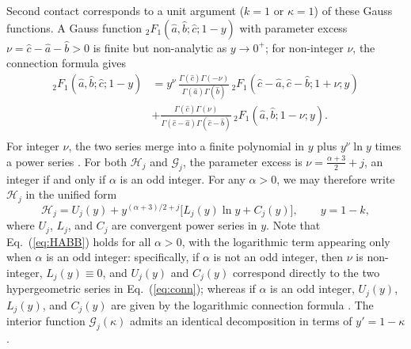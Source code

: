 \documentclass[11pt]{article}
\begin{document}
Second contact corresponds to a unit argument ($k=1$ or $\kappa=1$) of these Gauss functions. A Gauss function ${}_2F_1(\hat a,\hat b;\hat c;1-y)$ with parameter excess $\nu=\hat c-\hat a-\hat b>0$ is finite but non-analytic as $y\to0^+$; for non-integer $\nu$, the connection formula \citep[15.8.4]{DLMF} gives
\begin{equation}
\begin{aligned}
{}_2F_1(\hat a,\hat b;\hat c;1-y)&=y^\nu\,\frac{\Gamma(\hat c)\Gamma(-\nu)}{\Gamma(\hat a)\Gamma(\hat b)}\,{}_2F_1(\hat c-\hat a,\hat c-\hat b;1+\nu;y)\\
&+\frac{\Gamma(\hat c)\Gamma(\nu)}{\Gamma(\hat c-\hat a)\Gamma(\hat c-\hat b)}\,{}_2F_1(\hat a,\hat b;1-\nu;y).\\
\end{aligned} \label{eq:conn}
\end{equation}
For integer $\nu$, the two series merge into a finite polynomial in $y$ plus $y^\nu\ln y$ times a power series \citep[15.8.10]{DLMF}. For both $\mathcal H_j$ and $\mathcal G_j$, the parameter excess is $\nu=\tfrac{\alpha+3}{2}+j$, an integer if and only if $\alpha$ is an odd integer. For any $\alpha>0$, we may therefore write $\mathcal H_j$ in the unified form
\begin{equation}
\mathcal H_j=U_j(y)+y^{(\alpha+3)/2+j}\bigl[L_j(y)\ln y+C_j(y)\bigr],\qquad y=1-k, \label{eq:HABB}
\end{equation}
where $U_j$, $L_j$, and $C_j$ are convergent power series in $y$. Note that Eq.~(\ref{eq:HABB}) holds for all $\alpha>0$, with the logarithmic term appearing only when $\alpha$ is an odd integer: specifically, if $\alpha$ is not an odd integer, then $\nu$ is non-integer, $L_j(y)\equiv 0$, and $U_j(y)$ and $C_j(y)$ correspond directly to the two hypergeometric series in Eq.~(\ref{eq:conn}); whereas if $\alpha$ is an odd integer, $U_j(y)$, $L_j(y)$, and $C_j(y)$ are given by the logarithmic connection formula \citep[15.8.10]{DLMF}. The interior function $\mathcal G_j(\kappa)$ admits an identical decomposition in terms of $y'=1-\kappa$.
\end{document}
